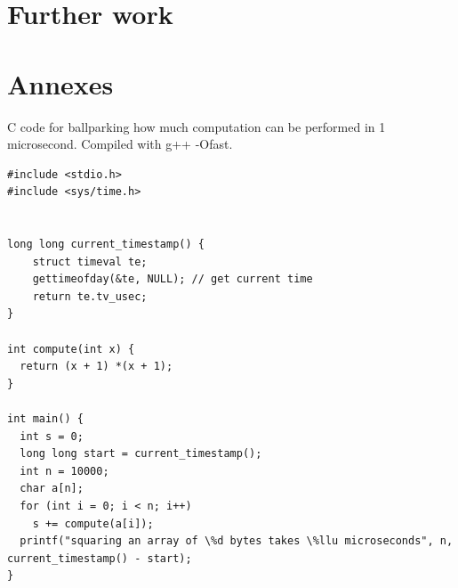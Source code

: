 \documentclass[11pt]{article} %
\begin{document}
\section{Further work}


\section{Annexes}


C code for ballparking how much computation can be performed in 1 microsecond.
Compiled with g++ -Ofast.
\begin{lstlisting}
#include <stdio.h>
#include <sys/time.h>


long long current_timestamp() {
    struct timeval te; 
    gettimeofday(&te, NULL); // get current time
    return te.tv_usec;
}

int compute(int x) {
  return (x + 1) *(x + 1);
}

int main() {
  int s = 0;
  long long start = current_timestamp(); 
  int n = 10000;
  char a[n];
  for (int i = 0; i < n; i++)
    s += compute(a[i]);
  printf("squaring an array of \%d bytes takes \%llu microseconds", n, current_timestamp() - start);
}
\end{lstlisting}


\newpage

\end{document}
